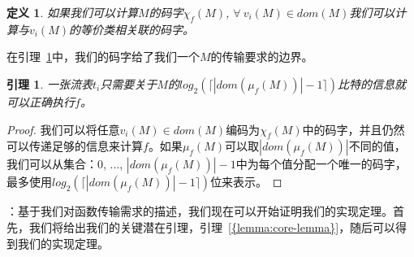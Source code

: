 \documentclass{ctexart}
\newcommand{\para}[1]{\smallskip\noindent {\bf #1}}
\newtheorem{definition}{定义}
\newtheorem{lemma}{引理}
\newtheorem{proof}{证明}
\begin{document}
\begin{definition} 如果我们可以计算$M$的码字$\chi_f(M)$, $\forall\ v_i(M) \in dom(M)$我们可以计算与$v_i(M)$的等价类相关联的码字。
\end{definition}

在引理~\ref{lemma:codewords}中，我们的码字给了我们一个$M$的传输要求的边界。

\begin{lemma} 
\label{lemma:codewords}
一张流表$t_i$只需要关于$M$的$log_2(\lceil |dom(\mu_f(M))|-1 \rceil)$比特的信息就可以正确执行$f$。
\end{lemma}

\begin{proof}
我们可以将任意$v_i(M) \in dom(M)$编码为$\chi_f(M)$中的码字，并且仍然可以传递足够的信息来计算$f$。如果$\mu_f(M)$可以取$|dom(\mu_f(M))|$不同的值，我们可以从集合：$0$, $...$, $|dom(\mu_f(M))|-1$中为每个值分配一个唯一的码字，最多使用$log_2(\lceil |dom(\mu_f(M))|-1 \rceil)$位来表示。
\end{proof}

\para{实现定理的证明}：基于我们对函数传输需求的描述，我们现在可以开始证明我们的实现定理。首先，我们将给出我们的关键潜在引理，引理~\ref{{lemma:core-lemma}}，随后可以得到我们的实现定理。
\end{document}
